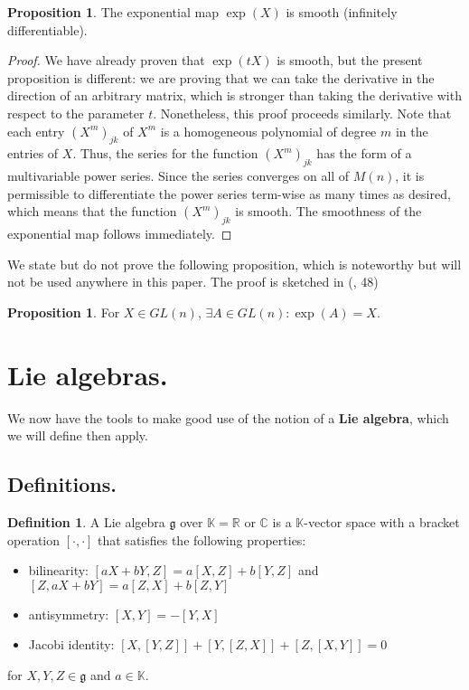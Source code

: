 \documentclass[12pt]{article}
\newcommand{\C}{\mathbb{C}}
\newcommand{\R}{\mathbb{R}}
\newcommand{\K}{\mathbb{K}}
\newcommand{\g}{\mathfrak{g}}
\theoremstyle{definition}
\newtheorem{prop}[them]{Proposition}
\theoremstyle{definition}
\theoremstyle{definition}
\theoremstyle{definition}
\theoremstyle{definition}
\newtheorem{defn}[them]{Definition}
\theoremstyle{definition}
\theoremstyle{definition}
\theoremstyle{definition}
\begin{document}
\begin{prop} The exponential map $\exp(X)$ is smooth
(infinitely differentiable).\end{prop}
\begin{proof} We have already
proven that $\exp(tX)$ is smooth, but the present proposition
is different: we are proving that we can take the
derivative in the direction of an arbitrary
matrix, which is stronger than taking the
derivative with respect to the parameter $t$.
Nonetheless, this proof proceeds similarly. Note
that each entry ${(X^m)}_{jk}$ of $X^m$ is a homogeneous
polynomial of degree $m$ in the entries of $X$.
Thus, the series for the function ${(X^m)}_{jk}$ has
the form of a multivariable power series. Since
the series converges on all of $M(n)$, it is
permissible to differentiate the power series
term-wise as many times as desired, which means
that the function ${(X^m)}_{jk}$ is smooth. The
smoothness of the exponential map follows
immediately.
\end{proof}

\par{We state but do not prove the following
proposition, which is noteworthy but will not be
used anywhere in this paper. The proof is sketched
in (\cite{Hall}, 48)}
\begin{prop} For $X \in GL(n)$,
$\exists A \in GL(n): \exp(A) = X$.\end{prop}

\section{Lie algebras.}
\par{We now have the tools to make good use of the
notion of a \textbf{Lie algebra}, which we will
define then apply.}

\subsection{Definitions.}
\begin{defn}A Lie algebra $\g$ over $\K = \R$
or $\C$ is a $\K$-vector space with a bracket operation
$[\cdot,\cdot]$ that satisfies the following
properties:
\begin{itemize}
    \item bilinearity: $[aX + bY, Z] = a[X, Z] +
    b[Y, Z]$ and $[Z, aX + bY] = a[Z, X] +
    b[Z, Y]$
    \item antisymmetry: $[X,Y] = -[Y,X]$
    \item Jacobi identity: $[X, [Y, Z]] + [Y, [Z,
    X]] + [Z, [X, Y]] = 0$
\end{itemize}
for $X, Y, Z \in \g$ and $a \in \K$.
\end{defn}
\end{document}
